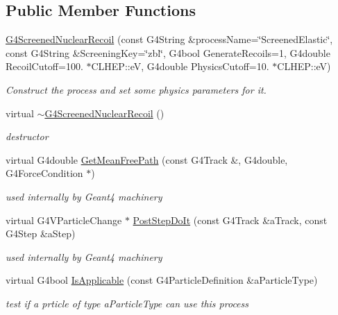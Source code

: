 \subsection*{Public Member Functions}
\begin{DoxyCompactItemize}
\item 
\hyperlink{classG4ScreenedNuclearRecoil_aef8f67b31b487b3fff30f773b9ad6a65}{G4\+Screened\+Nuclear\+Recoil} (const G4\+String \&process\+Name=\char`\"{}Screened\+Elastic\char`\"{}, const G4\+String \&Screening\+Key=\char`\"{}zbl\char`\"{}, G4bool Generate\+Recoils=1, G4double Recoil\+Cutoff=100. $\ast$C\+L\+H\+E\+P\+::eV, G4double Physics\+Cutoff=10. $\ast$C\+L\+H\+E\+P\+::eV)
\begin{DoxyCompactList}\small\item\em Construct the process and set some physics parameters for it. \end{DoxyCompactList}\item 
virtual \hyperlink{classG4ScreenedNuclearRecoil_ab0abe5d31e651ae07660f01dbeb4981f}{$\sim$\+G4\+Screened\+Nuclear\+Recoil} ()
\begin{DoxyCompactList}\small\item\em destructor \end{DoxyCompactList}\item 
virtual G4double \hyperlink{classG4ScreenedNuclearRecoil_ab00d6e1a7592a577e9c10ca4c62375ae}{Get\+Mean\+Free\+Path} (const G4\+Track \&, G4double, G4\+Force\+Condition $\ast$)
\begin{DoxyCompactList}\small\item\em used internally by Geant4 machinery \end{DoxyCompactList}\item 
virtual G4\+V\+Particle\+Change $\ast$ \hyperlink{classG4ScreenedNuclearRecoil_afd0ebeb0fa559a64263c27d7d9912919}{Post\+Step\+Do\+It} (const G4\+Track \&a\+Track, const G4\+Step \&a\+Step)
\begin{DoxyCompactList}\small\item\em used internally by Geant4 machinery \end{DoxyCompactList}\item 
virtual G4bool \hyperlink{classG4ScreenedNuclearRecoil_a3f764c88f7a12951ff16b184081f7fd9}{Is\+Applicable} (const G4\+Particle\+Definition \&a\+Particle\+Type)
\begin{DoxyCompactList}\small\item\em test if a prticle of type {\itshape a\+Particle\+Type} can use this process \end{DoxyCompactList}\item 

\end{DoxyCompactItemize}
